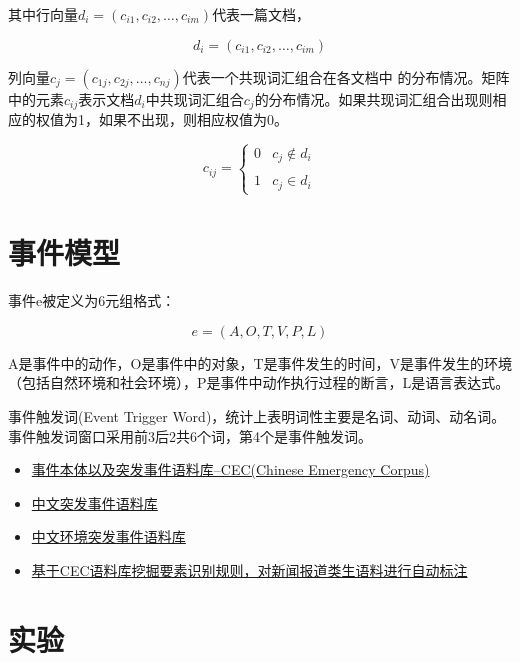 其中行向量\(d_i=(c_{i1},c_{i2}, \ldots,c_{im} )\)代表一篇文档，

\begin{equation}
d_i = (c_{i1}, c_{i2}, \ldots, c_{im})
\end{equation}

列向量\(c_j = (c_{1j}, c_{2j}, \ldots,c_{nj})\)代表一个共现词汇组合在各文档中
的分布情况。矩阵中的元素\(c_{ij}\)表示文档\(d_i\)中共现词汇组合\(c_j\)的分布情况。如果共现词汇组合出现则相应的权值为1，如果不出现，则相应权值为0。

\begin{equation}
c_{ij} = 
\begin{cases} 
    0 & c_j \notin d_i  \\\\
    1 & c_j \in d_i
\end{cases}
\end{equation}

\section{事件模型}\label{ux4e8bux4ef6ux6a21ux578b}

事件e被定义为6元组格式：

\begin{equation}
e = (A, O, T, V, P, L)
\end{equation}

A是事件中的动作，O是事件中的对象，T是事件发生的时间，V是事件发生的环境（包括自然环境和社会环境），P是事件中动作执行过程的断言，L是语言表达式。

事件触发词(Event Trigger
Word)，统计上表明词性主要是名词、动词、动名词。事件触发词窗口采用前3后2共6个词，第4个是事件触发词。

\begin{itemize}
\tightlist
\item
  \href{http://blog.csdn.net/shijiebei2009/article/details/44538257}{事件本体以及突发事件语料库--CEC(Chinese
  Emergency Corpus)}
\item
  \href{https://github.com/shijiebei2009/CEC-Corpus}{中文突发事件语料库}
\item
  \href{https://github.com/shijiebei2009/CEEC-Corpus}{中文环境突发事件语料库}
\item
  \href{https://github.com/shijiebei2009/CEC-Automatic-Annotation}{基于CEC语料库挖掘要素识别规则，对新闻报道类生语料进行自动标注}
\end{itemize}

\section{实验}\label{ux5b9eux9a8c}

